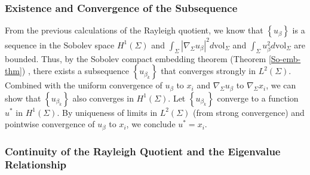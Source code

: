 \documentclass[a4, 12pt]{amsart}
\numberwithin{equation}{section} \numberwithin{equation}{section}
\begin{document}
\subsubsection{Existence and Convergence of the Subsequence}

From the previous calculations of the Rayleigh quotient, we know that $\left\{u_{\beta}\right\}$ is a sequence in the Sobolev space $H^{1}(\Sigma)$ and $\int_{\Sigma}\left|\nabla_{\Sigma} u_{\beta}\right|^{2} d \mathrm{vol}_{\Sigma}$ and $\int_{\Sigma} u_{\beta}^{2} d\text{vol}_{\Sigma}$ are bounded. Thus, by the Sobolev compact embedding theorem (Theorem \ref{So-emb-thm}) \cite{Au}, there exists a subsequence $\left\{u_{\beta_{k}}\right\}$ that converges strongly in $L^{2}(\Sigma)$.
Combined with the uniform convergence of $u_{\beta}$ to $x_{i}$ and $\nabla_{\Sigma} u_{\beta}$ to $\nabla_{\Sigma} x_{i}$, we can show that $\left\{u_{\beta_{k}}\right\}$ also converges in $H^{1}(\Sigma)$. Let $\left\{u_{\beta_{k}}\right\}$ converge to a function $u^*$ in $H^{1}(\Sigma)$. By uniqueness of limits in $L^2(\Sigma)$ (from strong convergence) and pointwise convergence of $u_\beta$ to $x_i$, we conclude $u^* = x_i$.




\subsubsection{Continuity of the Rayleigh Quotient and the Eigenvalue Relationship}
\end{document}
